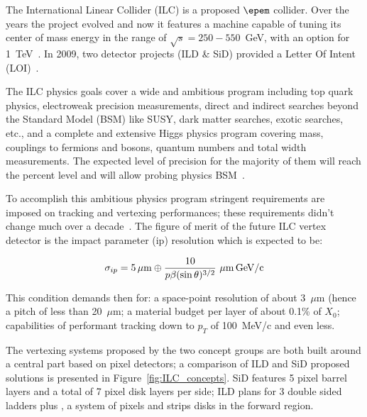 The International Linear Collider (ILC) is a proposed $\epem$ collider. Over the years the project 
evolved and now it features a machine capable of tuning its center of mass energy in the range of 
$\sqrt{s}=250-550$~GeV, with an option for 1~TeV~\cite{ILCTDR}.  
In 2009, two detector projects (ILD \& SiD) provided a Letter Of Intent (LOI)~\cite{ILDLOI,SIDLOI}.

The ILC physics goals cover a wide and ambitious program including top quark physics, electroweak 
precision measurements, direct and indirect searches beyond the Standard Model (BSM) like SUSY, 
dark matter searches, exotic searches, etc., and a complete and extensive Higgs physics program 
covering mass, couplings to fermions and bosons, quantum numbers and total width 
measurements.  The expected level of precision for the majority of them will 
reach the percent level and will allow probing physics BSM~\cite{ILCVertexing2016}.

To accomplish this ambitious physics program stringent requirements are imposed on tracking and 
vertexing performances; these requirements didn't change much over a 
decade~\cite{ILCVertexing2007,ILCVertexing2016}. 
The  figure of merit of the future ILC vertex detector  is the impact parameter (ip) resolution which is 
expected to be:

\begin{equation}
\sigma_{ip}=5\,\mu{\rm m}\oplus\dfrac{10}{p\beta(\sin\theta)^{3/2}}\,\,\mu{\rm m\, GeV/c}
\label{eq:ILCipres}
\end{equation}

This condition demands then for: a space-point resolution of about 3~$\mu$m (hence a pitch of less 
than 20~$\mu$m; a material budget per layer of about 0.1\% of $X_0$; capabilities of performant    
tracking	down to $p_T$ of 100~MeV/c and even less.

The vertexing systems proposed by the two concept groups are both built around a central 
part based on pixel detectors; a comparison of ILD and SiD proposed solutions is presented in 
Figure~\ref{fig:ILC_concepts}. SiD features 5 pixel barrel layers and a total of 7 pixel disk layers 
per side; ILD plans for 3 double sided ladders plus , a system of pixels and strips disks  in the forward 
region.

